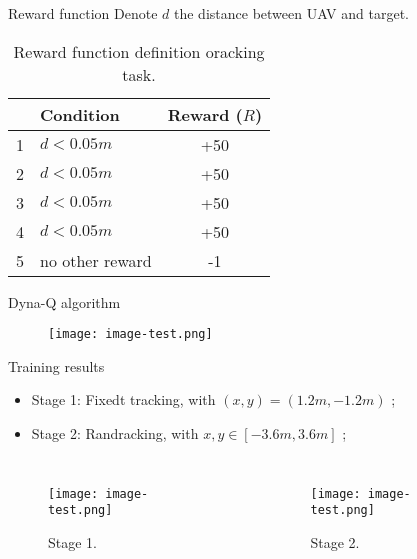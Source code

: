 \documentclass[table,aspectratio=1610]{beamer}%
\begin{document}
\begin{frame}{Reward function}	
	Denote $ d $ the distance between UAV and target.
	\begin{table}
		\small 
		\centering
		\caption{Reward function definition oracking task.}
		\label{table:reward:function}
		\begin{tabular}{|c|l|c|}
			\hline
			  & \bfseries Condition & \bfseries Reward ($ R $) \\ \hline
			1 & $ d<0.05m $ & +50  \\ \hline
			2 & $ d<0.05m $ & +50  \\ \hline
			3 & $ d<0.05m $ & +50  \\ \hline
			4 & $ d<0.05m $ & +50  \\ \hline
			5 & no other reward  & -1 \\ \hline	
		\end{tabular}
	\end{table}
	
\end{frame}



\begin{frame}{Dyna-Q algorithm}
	\begin{figure}
		\centering
		\texttt{[image: image-test.png]}
	\end{figure}
\end{frame}

\begin{frame}{Training results}
	\begin{itemize}
		\item Stage 1: Fixedt tracking, with $ (x,y) =(1.2m,-1.2m) $ ;
		\item Stage 2: Randracking, with $ x , y \in [-3.6m,3.6m] $ ;
	\end{itemize}
	\begin{columns}
		\pause
		\begin{figure}
			\centering
			\texttt{[image: image-test.png]}
			\caption{Stage 1.}
		\end{figure}
		
		\pause
		\begin{figure}
			\centering
			\texttt{[image: image-test.png]}
			\caption{Stage 2.}
		\end{figure}
	\end{columns}
\end{frame}
\end{document}
